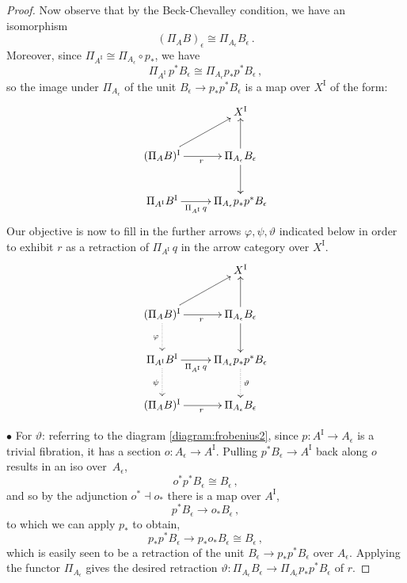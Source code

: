\documentclass[11pt]{article}
\newcommand{\ra}{\ensuremath{\rightarrow}}
\newcommand{\I}{\ensuremath{\mathrm{I}}}
\theoremstyle{remark}
\theoremstyle{definition}
\begin{document}
\begin{proof}
Now observe that by the Beck-Chevalley condition, we have an isomorphism 
\[
(\Pi_AB )_\epsilon \cong \Pi_{A_\epsilon} B_\epsilon \,.
\]
Moreover, since $\Pi_{A^\I} \cong \Pi_{A_\epsilon} \circ p_*$, we have
\[
 \Pi_{A^\I}\,p^*B_\epsilon \cong \Pi_{A_\epsilon} p_*p^* B_\epsilon \,,
\]
so the image under $\Pi_{A_\epsilon}$ of the unit $B_\epsilon \ra p_*p^* B_\epsilon$ is a map over $X^\I$ of the form:
\begin{equation}\label{diagram:frobenius3}
\xymatrix{
& X^\I  \\
 (\Pi_AB)^\I  \ar[r]_r   \ar[ru] & \Pi_{A_\epsilon}B_\epsilon  \ar[u] \ar[d]\\
 \Pi_{A^\I}B^\I \ar[r]_-{\Pi_{A^\I}\,q} & \Pi_{A_\epsilon} p_*p^* B_\epsilon
}
\end{equation}
Our objective is now to fill in the further arrows $\varphi, \psi,\vartheta$ indicated below in order to exhibit $r$ as a retraction of $\Pi_{A^\I}\,q$ in the arrow category over $X^\I$.
\begin{equation}\label{diagram:frobenius4}
\xymatrix{
& X^\I  \\
 (\Pi_AB)^\I  \ar[r]_r  \ar[ru] \ar@{..>}[d]_\varphi & \Pi_{A_\epsilon}B_\epsilon  \ar[u] \ar[d]\\
 \Pi_{A^\I}B^\I \ar[r]_-{\Pi_{A^\I}\,q} \ar@{..>}[d]_\psi & \Pi_{A_\epsilon} p_*p^* B_\epsilon \ar@{..>}[d]^\vartheta\\
  (\Pi_AB)^\I  \ar[r]_r  & \Pi_{A_\epsilon}B_\epsilon
}
\end{equation}

\smallskip

\noindent $\bullet$ For $\vartheta$: referring to the diagram \eqref{diagram:frobenius2}, since $p : A^\I \ra A_\epsilon$ is a trivial fibration, it has a section $o :  A_\epsilon \ra A^\I$.  Pulling  $p^*B_\epsilon \ra A^\I$ back along $o$ results in an iso over~$A_\epsilon$,
\[
o^*p^* B_\epsilon \cong B_\epsilon \,,
\]
and so by the adjunction $o^*\!\dashv o_*$ there is a map over $A^\I$,
\[
p^* B_\epsilon \to o_* B_\epsilon \,,
\]
to which we can apply $p_*$ to obtain,
\[
p_*p^* B_\epsilon \to p_*o_*B_\epsilon \cong B_\epsilon\,,
\]
which is easily seen to be a retraction of the unit $B_\epsilon \ra p_*p^* B_\epsilon$ over $A_\epsilon$.  Applying the functor $ \Pi_{A_\epsilon}$ gives the desired retraction $\vartheta : \Pi_{A_\epsilon}B_\epsilon \ra \Pi_{A_\epsilon}p_*p^* B_\epsilon$ of $r$.


\end{proof}
\end{document}
